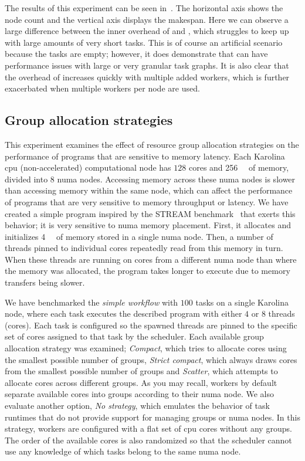 The results of this experiment can be seen in~. The horizontal axis shows
the node count and the vertical axis displays the makespan. Here we can observe a large difference
between the inner overhead of \hyperqueue{} and \dask{}, which struggles
to keep up with large amounts of very short tasks. This is of course an artificial scenario because
the tasks are empty; however, it does demonstrate that \dask{} can have
performance issues with large or very granular task graphs. It is also clear that the overhead of
\dask{} increases quickly with multiple added workers, which is further exacerbated
when multiple workers per node are used.

\subsection{Group allocation strategies}
\label{sec:hq-exp-numa}
This experiment examines the effect of resource group allocation strategies on the
performance of programs that are sensitive to memory latency. Each Karolina
\gls{cpu} (non-accelerated)
computational node has $128$ cores and \SI{256}{\gibi\byte} of memory, divided
into $8$ \gls{numa} nodes. Accessing memory across these
\gls{numa} nodes is slower than accessing memory within the same node, which can
affect the performance of programs that are very sensitive to memory throughput or latency. We have
created a simple program inspired by the STREAM benchmark~\cite{stream} that exerts this
behavior; it is very sensitive to \gls{numa} memory placement. First, it allocates and
initializes \SI{4}{\gibi\byte} of memory stored in a single \gls{numa} node.
Then, a number of threads pinned to individual cores repeatedly read from this memory in turn. When
these threads are running on cores from a different \gls{numa} node than where the memory was
allocated, the program takes longer to execute due to memory transfers being slower.

We have benchmarked the \emph{simple workflow} with $100$ tasks on a single
Karolina node, where each task executes the described program with either $4$
or $8$ threads (cores). Each task is configured so the spawned threads are
pinned to the specific set of cores assigned to that task by the
scheduler. Each available group allocation strategy was
examined; \emph{Compact}, which tries to allocate cores using the smallest possible
number of groups, \emph{Strict compact}, which always draws cores from the smallest possible
number of groups and \emph{Scatter}, which attempts to allocate cores across different groups.
As you may recall,
\hyperqueue{} workers by default separate available cores into groups according to their
\gls{numa} node. We also evaluate another option, \emph{No strategy}, which
emulates the behavior of task runtimes that do not provide support for managing groups or
\gls{numa} nodes. In this strategy, workers are configured with a flat set of
\gls{cpu} cores without any groups. The order of the available cores is also
randomized so that the scheduler cannot use any knowledge of which tasks belong to the same
\gls{numa} node.

